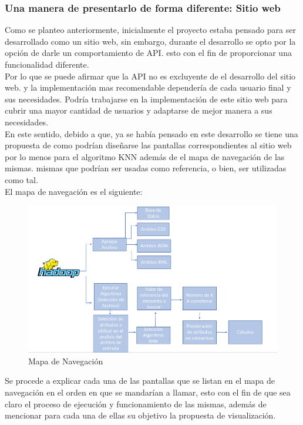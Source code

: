 \subsubsection{Una manera de presentarlo de forma diferente: Sitio web}
Como se planteo anteriormente, inicialmente el proyecto estaba pensado para ser desarrollado como un sitio web, sin embargo, durante el desarrollo se opto por la opción de darle un comportamiento de API. esto con el fin de proporcionar una funcionalidad diferente. \\
Por lo que se puede afirmar que la API no es excluyente de el desarrollo del sitio web. y la implementación mas recomendable dependería de cada usuario final y sus necesidades. Podría trabajarse en la implementación de este sitio web para cubrir una mayor cantidad de usuarios y adaptarse de mejor manera a sus necesidades.\\
En este sentido, debido a que, ya se había pensado en este desarrollo se tiene una propuesta de como podrían diseñarse las pantallas correspondientes al sitio web por lo menos para el algoritmo KNN además de el mapa de navegación de las mismas. mismas que podrían ser usadas como referencia, o bien, ser utilizadas como tal.\\
El mapa de navegación es el siguiente:\\
\begin{figure}[!htbp]
	\hypertarget{fig:red}{\hspace{1pt}}
	\begin{center}
		\includegraphics[width=.9\textwidth]{capitulo7/images/mapadenavegacion.png}
		\caption{Mapa de Navegación}
		\label{fig:mapanav}
	\end{center}
\end{figure}
\newpage
Se procede a explicar cada una de las pantallas que se listan en el mapa de navegación en el orden en que se mandarían a llamar, esto con el fin de que sea claro el proceso de ejecución y funcionamiento de las mismas, además de mencionar para cada una de ellas su objetivo la propuesta de visualización.\\
